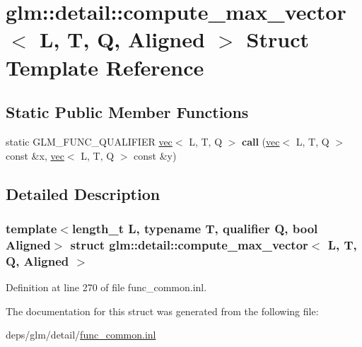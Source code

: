 \hypertarget{structglm_1_1detail_1_1compute__max__vector}{}\section{glm\+:\+:detail\+:\+:compute\+\_\+max\+\_\+vector$<$ L, T, Q, Aligned $>$ Struct Template Reference}
\label{structglm_1_1detail_1_1compute__max__vector}
\subsection*{Static Public Member Functions}
\begin{DoxyCompactItemize}
\item 
\mbox{\label{structglm_1_1detail_1_1compute__max__vector_a8eb01a7ef3c3e1898a1d2ddbb66168d9}} 
static G\+L\+M\+\_\+\+F\+U\+N\+C\+\_\+\+Q\+U\+A\+L\+I\+F\+I\+ER \hyperlink{structglm_1_1vec}{vec}$<$ L, T, Q $>$ {\bfseries call} (\hyperlink{structglm_1_1vec}{vec}$<$ L, T, Q $>$ const \&x, \hyperlink{structglm_1_1vec}{vec}$<$ L, T, Q $>$ const \&y)
\end{DoxyCompactItemize}


\subsection{Detailed Description}
\subsubsection*{template$<$length\+\_\+t L, typename T, qualifier Q, bool Aligned$>$\newline
struct glm\+::detail\+::compute\+\_\+max\+\_\+vector$<$ L, T, Q, Aligned $>$}



Definition at line 270 of file func\+\_\+common.\+inl.



The documentation for this struct was generated from the following file\+:\begin{DoxyCompactItemize}
\item 
deps/glm/detail/\hyperlink{func__common_8inl}{func\+\_\+common.\+inl}\end{DoxyCompactItemize}

